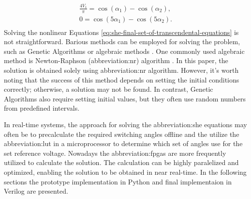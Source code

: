 \documentclass[a4paper, twoside, 11pt]{article}
\begin{document}
            \begin{equation}
                \begin{gathered}
                    \frac{4 V_1}{\pi} = \cos(\alpha_1) - \cos(\alpha_2),\\
                    0 = \cos(5 \alpha_1) - \cos(5 \alpha_2).\\
                \end{gathered}
                \label{eq:she-final-set-of-transcendental-equations}
            \end{equation}
            Solving the nonlinear Equations \ref{eq:she-final-set-of-transcendental-equations} is not straightforward. Barious methods can be employed for solving the problem, such as Genetic Algorithms \cite{taghizadeh-Harmonic-elimination-of-multilevel-inverters-using-particle-swarm-optimization, Ortiz-Espinoza-PWM-with-Selective-Harmonic-Elimination-Using-Optimization-Inspired-on-Earthquakes-for-AC-Electric-Drives, Abdelqawee_Naser-SELECTIVE-HARMONIC-ELIMINATION-PWM-VOLTAGE-SOURCE-INVERTER-BASED-ON-GENETIC-ALGORITHM} or algebraic methods \cite{wang-A-Comprehensive-Review-of-Solving-Selective-Harmonic-Elimination-Problem-with-Algebraic-Algorithms, Chiasson-A-Complete-Solution-to-the-Harmonic-Elimination-Problem}. One commonly used algebraic method is Newton-Raphson (\gls{abbreviation:nr}) algorithm \cite{Balow-A-Selective-Harmonic-Elimination-SHE-Technique-for-the-Multi-Leveled-Inverters}. In this paper, the solution is obtained solely using \gls{abbreviation:nr} algorithm. However, it's worth noting that the success of this method depends on setting the initial conditions correctly; otherwise, a solution may not be found. In contrast, Genetic Algorithms also require setting initial values, but they often use random numbers from predefined intervals.\par
            In real-time systems, the approach for solving the \gls{abbreviation:she} equations may often be to precalculate the required switching angles offline and the utilize the \gls{abbreviation:lut} in a microprocessor to determine which set of angles use for the set reference voltage. Nowadays the \gls{abbreviation:fpga}s are more frequently utilized to calculate the solution. The calculation can be highly paralelized and optimized, enabling the solution to be obtained in near real-time. In the following sections the prototype implementation in Python and final implementaion in Verilog are presented.
\end{document}
